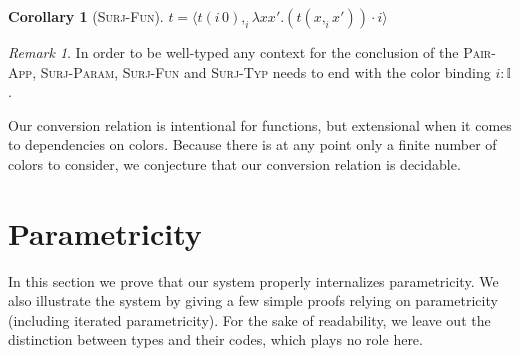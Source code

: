 \documentclass[english]{PaperTools/latex/entcs}
\theoremstyle{plain}
\newtheorem{corollary}[theorem]{Corollary}
\theoremstyle{definition}
\theoremstyle{remark}
\newtheorem*{remark}{Remark}
\newcommand\CP[3]{(#2,_{#1} #3)}
\newcommand\CTimes[2]{(#2) ×_{#1}}
\newcommand\param[1]{\!\cdot\!#1}
\newcommand\op[1]{∋_{#1}}
\newcommand\fp[3]{⟨#2 ,_{#1} #3⟩}
\newcommand\mor[2]{({#1}\,{#2})}
\newcommand\proj[2]{{#2}\mor{#1}0}
\begin{document}
\begin{corollary}[\textsc{Surj-Fun}]
  \label{cor:surj-fun}
  $t = \fp i {\proj i t} {λx x'. (t \CP i x {x'}) \param i}$
\end{corollary}

\begin{remark}
  In order to be well-typed any context for the conclusion of the
  \textsc{Pair-App}, \textsc{Surj-Param}, \textsc{Surj-Fun} and
  \textsc{Surj-Typ} needs to end with the color binding $i : 𝕀$.
\end{remark}


Our conversion relation is intentional for functions, but extensional
when it comes to dependencies on colors. Because there is at any point
only a finite number of colors to consider, we conjecture that our
conversion relation is decidable.

\section{Parametricity}
\label{sec:parametricity}
In this section we prove that our system properly internalizes
parametricity. We also illustrate the system by giving a few simple
proofs relying on parametricity (including iterated parametricity).
For the sake of readability, we leave out the distinction between types
and their codes, which plays no role here.
\end{document}

